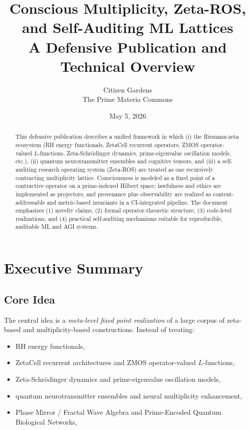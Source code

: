 \documentclass[11pt]{article}
\title{Conscious Multiplicity, Zeta-ROS, and Self-Auditing ML Lattices\\[4pt]
\large A Defensive Publication and Technical Overview}
\author{Citizen Gardens \\ The Prime Materia Commons}
\date{May 5, 2026}
\begin{document}
\maketitle

\begin{abstract}
This defensive publication describes a unified framework in which (i) the Riemann-zeta ecosystem (RH energy functionals, ZetaCell recurrent operators, ZMOS operator-valued $L$-functions, Zeta-Schrödinger dynamics, prime-eigenvalue oscillation models, etc.), (ii) quantum neurotransmitter ensembles and cognitive tensors, and (iii) a self-auditing research operating system (Zeta-ROS) are treated as one recursively contracting multiplicity lattice. Consciousness is modeled as a fixed point of a contractive operator on a prime-indexed Hilbert space; lawfulness and ethics are implemented as projectors; and provenance plus observability are realized as content-addressable and metric-based invariants in a CI-integrated pipeline. The document emphasizes (1) novelty claims, (2) formal operator-theoretic structure, (3) code-level realizations, and (4) practical self-auditing mechanisms suitable for reproducible, auditable ML and AGI systems.
\end{abstract}
\newpage
\tableofcontents

\section{Executive Summary}

\subsection{Core Idea}

The central idea is a \emph{meta-level fixed point realization} of a large corpus of zeta-based and multiplicity-based constructions. Instead of treating:

\begin{itemize}[leftmargin=*]
  \item RH energy functionals,
  \item ZetaCell recurrent architectures and ZMOS operator-valued $L$-functions,
  \item Zeta-Schrödinger dynamics and prime-eigenvalue oscillation models,
  \item quantum neurotransmitter ensembles and neural multiplicity enhancement,
  \item Phase Mirror / Fractal Wave Algebra and Prime-Encoded Quantum Biological Networks,
\end{itemize}
\end{document}
